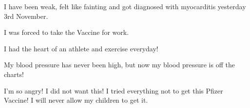 I have been weak, felt like fainting and got diagnosed with myocarditis
yesterday 3rd November.

I was forced to take the Vaccine for work.

I had the heart of an athlete and exercise everyday!

My blood pressure has never been high, but now my blood pressure is off the
charts!

I’m so angry! I did not want this! I tried everything not to get this Pfizer
Vaccine! I will never allow my children to get it.

